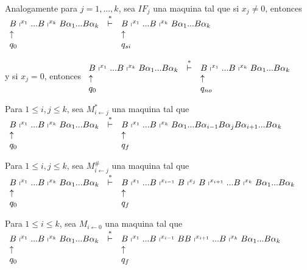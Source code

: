 Analogamente para \(j=1,...,k\), sea \(IF_{j}\) una maquina tal que si \( x_{j}\neq 0\), entonces
\(\displaystyle \begin{array}{lcl} B\shortmid ^{x_{1}}...B\shortmid ^{x_{k}}B\alpha _{1}...B\alpha _{k} & \overset{\ast }{\vdash } & B\shortmid ^{x_{1}}...B\shortmid ^{x_{k}}B\alpha _{1}...B\alpha _{k} \\ \uparrow & & \uparrow \\ q_{0} & & q_{si} \end{array} \)

y si \(x_{j}=0\), entonces
\(\displaystyle \begin{array}{lcl} B\shortmid ^{x_{1}}...B\shortmid ^{x_{k}}B\alpha _{1}...B\alpha _{k} & \overset{\ast }{\vdash } & B\shortmid ^{x_{1}}...B\shortmid ^{x_{k}}B\alpha _{1}...B\alpha _{k} \\ \uparrow & & \uparrow \\ q_{0} & & q_{no} \end{array} \)

Para \(1\leq i,j\leq k\), sea \(M_{i\leftarrow j}^{\ast }\) una maquina tal que
\(\displaystyle \begin{array}{lcl} B\shortmid ^{x_{1}}...B\shortmid ^{x_{k}}B\alpha _{1}...B\alpha _{k} & \overset{\ast }{\vdash } & B\shortmid ^{x_{1}}...B\shortmid ^{x_{k}}B\alpha _{1}...B\alpha _{i-1}B\alpha _{j}B\alpha _{i+1}...B\alpha _{k} \\ \uparrow & & \uparrow \\ q_{0} & & q_{f} \end{array} \)

Para \(1\leq i,j\leq k\), sea \(M_{i\leftarrow j}^{\#}\) una maquina tal que
\(\displaystyle \begin{array}{lcl} B\shortmid ^{x_{1}}...B\shortmid ^{x_{k}}B\alpha _{1}...B\alpha _{k} & \overset{\ast }{\vdash } & B\shortmid ^{x_{1}}...B\shortmid ^{x_{i-1}}B\shortmid ^{x_{j}}B\shortmid ^{x_{i+1}}...B\shortmid ^{x_{k}}B\alpha _{1}...B\alpha _{k} \\ \uparrow & & \uparrow \\ q_{0} & & q_{f} \end{array} \)

Para \(1\leq i\leq k\), sea \(M_{i\leftarrow 0}\) una maquina tal que
\(\displaystyle \begin{array}{lcl} B\shortmid ^{x_{1}}...B\shortmid ^{x_{k}}B\alpha _{1}...B\alpha _{k} & \overset{\ast }{\vdash } & B\shortmid ^{x_{1}}...B\shortmid ^{x_{i-1}}BB\shortmid ^{x_{i+1}}...B\shortmid ^{x_{k}}B\alpha _{1}...B\alpha _{k} \\ \uparrow & & \uparrow \\ q_{0} & & q_{f} \end{array} \)

